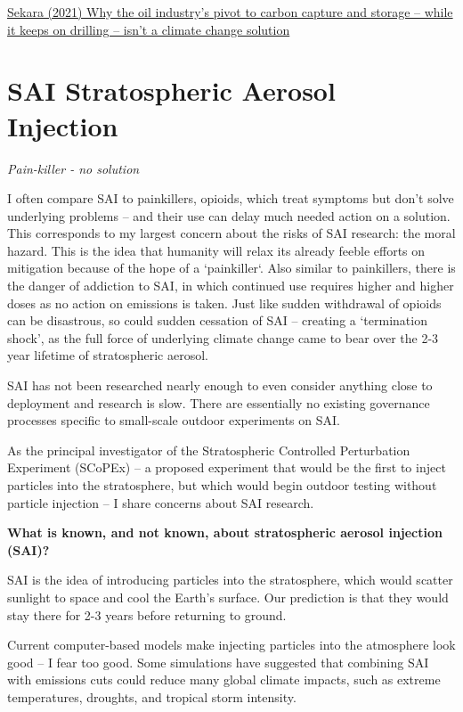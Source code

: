 \documentclass[
]{book}
\begin{document}
\href{https://theconversation.com/why-the-oil-industrys-pivot-to-carbon-capture-and-storage-while-it-keeps-on-drilling-isnt-a-climate-change-solution-171791}{Sekara (2021) Why the oil industry's pivot to carbon capture and storage -- while it keeps on drilling -- isn't a climate change solution}

\hypertarget{sai-stratospheric-aerosol-injection}{%
\chapter{SAI Stratospheric Aerosol Injection}\label{sai-stratospheric-aerosol-injection}}

\emph{Pain-killer - no solution}

I often compare SAI to painkillers, opioids, which treat symptoms but don't solve underlying problems -- and their use can delay much needed action on a solution.
This corresponds to my largest concern about the risks of SAI research: the moral hazard. This is the idea that humanity will relax its already feeble efforts on mitigation because of the hope of a `painkiller`.
Also similar to painkillers, there is the danger of addiction to SAI, in which continued use requires higher and higher doses as no action on emissions is taken. Just like sudden withdrawal of opioids can be disastrous, so could sudden cessation of SAI -- creating a `termination shock', as the full force of underlying climate change came to bear over the 2-3 year lifetime of stratospheric aerosol.

SAI has not been researched nearly enough to even consider anything close to deployment and research is slow. There are essentially no existing governance processes specific to small-scale outdoor experiments on SAI.

As the principal investigator of the Stratospheric Controlled Perturbation Experiment (SCoPEx) -- a proposed experiment that would be the first to inject particles into the stratosphere, but which would begin outdoor testing without particle injection -- I share concerns about SAI research.

\textbf{What is known, and not known, about stratospheric aerosol injection (SAI)?}

SAI is the idea of introducing particles into the stratosphere, which would scatter sunlight to space and cool the Earth's surface. Our prediction is that they would stay there for 2-3 years before returning to ground.

Current computer-based models make injecting particles into the atmosphere look good -- I fear too good. Some simulations have suggested that combining SAI with emissions cuts could reduce many global climate impacts, such as extreme temperatures, droughts, and tropical storm intensity.
\end{document}
